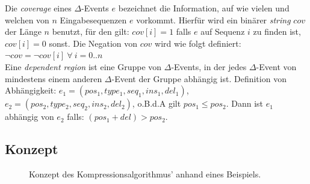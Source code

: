 \documentclass[12pt]{article}
\begin{document}
Die \emph{coverage} eines $\Delta$-Events $e$ bezeichnet die Information, auf wie vielen und welchen von $n$ Eingabesequenzen $e$ vorkommt. Hierfür wird ein binärer \emph{string} $cov$ der Länge $n$ benutzt, für den gilt: $cov[i] = 1$ falls $e$ auf Sequenz $i$ zu finden ist, $cov[i] = 0$ sonst. Die Negation von $cov$ wird wie folgt definiert: $\neg cov = \neg cov[i] ~\forall ~i= 0..n$\\

Eine \emph{dependent region} ist eine Gruppe von $\Delta$-Events, in der jedes $\Delta$-Event von mindestens einem anderen $\Delta$-Event der Gruppe abhängig ist.
Definition von Abhängigkeit: $e_{1} = (pos_{1},type_{1},seq_{1},ins_{1},del_{1})$, $e_{2} = (pos_{2},type_{2},seq_{2},ins_{2},del_{2})$, o.B.d.A gilt $pos_{1} \le pos_{2} $. Dann ist $e_{1}$ abhängig von $e_{2}$ falls: $(pos_{1}+del) > pos_{2}$.

\subsection{Konzept}

\begin{figure}
\caption{\label{fig:konzept}\footnotesize Konzept des Kompressionsalgorithmus' anhand eines Beispiels.}
\end{figure}
\end{document}
